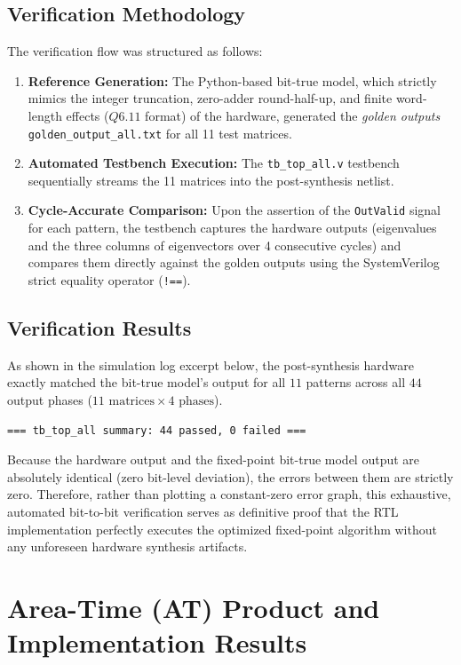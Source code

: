 \documentclass[11pt, a4paper]{article}
\begin{document}
\subsection{Verification Methodology}
The verification flow was structured as follows:
\begin{enumerate}
    \item \textbf{Reference Generation:} The Python-based bit-true model, which strictly mimics the integer truncation, zero-adder round-half-up, and finite word-length effects ($Q6.11$ format) of the hardware, generated the \textit{golden outputs} \texttt{golden\_output\_all.txt} for all 11 test matrices.
    \item \textbf{Automated Testbench Execution:} The \texttt{tb\_top\_all.v} testbench sequentially streams the 11 matrices into the post-synthesis netlist.
    \item \textbf{Cycle-Accurate Comparison:} Upon the assertion of the \texttt{OutValid} signal for each pattern, the testbench captures the hardware outputs (eigenvalues and the three columns of eigenvectors over 4 consecutive cycles) and compares them directly against the golden outputs using the SystemVerilog strict equality operator (\texttt{!==}).
\end{enumerate}

\subsection{Verification Results}
As shown in the simulation log excerpt below, the post-synthesis hardware exactly matched the bit-true model's output for all $11$ patterns across all $44$ output phases ($11 \text{ matrices} \times 4 \text{ phases}$).

\begin{verbatim}
=== tb_top_all summary: 44 passed, 0 failed ===
\end{verbatim}

Because the hardware output and the fixed-point bit-true model output are absolutely identical (zero bit-level deviation), the errors between them are strictly zero. Therefore, rather than plotting a constant-zero error graph, this exhaustive, automated bit-to-bit verification serves as definitive proof that the RTL implementation perfectly executes the optimized fixed-point algorithm without any unforeseen hardware synthesis artifacts.

\section{Area-Time (AT) Product and Implementation Results}
\end{document}
